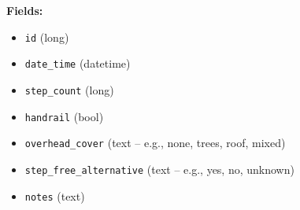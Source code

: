 \documentclass[11pt,a4paper]{article}
\begin{document}
\begin{itemize}
  \textbf{Fields:}

  \begin{itemize}
    \item \texttt{id} (long)
    \item \texttt{date\_time} (datetime)
    \item \texttt{step\_count} (long)
    \item \texttt{handrail} (bool)
    \item \texttt{overhead\_cover} (text -- e.g., none, trees, roof, mixed)
    \item \texttt{step\_free\_alternative} (text -- e.g., yes, no, unknown)
    \item \texttt{notes} (text)
  \end{itemize}
  
\end{itemize}
\end{document}

